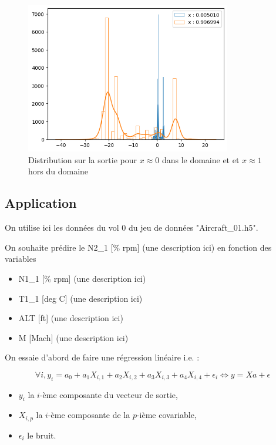 \documentclass[french,12pt]{article}
\let\oldsubsection\subsection%
\renewcommand{\subsection}{%
  \renewcommand{\theequation}{\thesubsection.\arabic{equation}}%
  \oldsubsection}%
\begin{document}
\begin{figure}[H]
    \centering
    \includegraphics[width = 0.8\textwidth]{../plots/outputUQSin.png}
    \caption{Distribution sur la sortie pour $x \approx 0$ dans le domaine et et $x \approx 1$ hors du domaine}
\end{figure}

\subsection{Application}

On utilise ici les données du vol 0 du jeu de données "Aircraft\_01.h5".

On souhaite prédire le N2\_1 [\% rpm] (une description ici) en fonction des variables

\begin{itemize}
    \item N1\_1 [\% rpm] (une description ici)
    \item T1\_1 [deg C] (une description ici)
    \item ALT [ft] (une description ici)
    \item M [Mach] (une description ici)
\end{itemize}

On essaie d'abord de faire une régression linéaire i.e. :

\begin{equation}
    \forall i, y_i = a_0 + a_1 X_{i, 1}+ a_2 X_{i, 2}+ a_3 X_{i, 3}+ a_4 X_{i, 4} + \epsilon_i \Leftrightarrow y = X a + \epsilon  
\end{equation}

\begin{itemize}
    \item $y_i$ la $i$-ème composante du vecteur de sortie,
    \item $X_{i,p}$ la $i$-ème composante de la $p$-ième covariable,
    \item $\epsilon_i$ le bruit.
\end{itemize}
\end{document}
